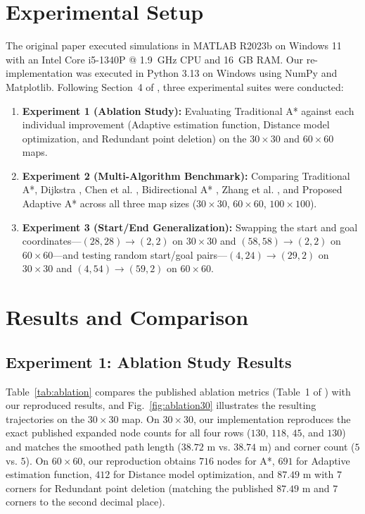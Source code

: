 \documentclass[conference]{IEEEtran}
\begin{document}
\begin{enumerate}
\section{Experimental Setup}
The original paper executed simulations in MATLAB R2023b on Windows 11 with an Intel Core i5-1340P @ 1.9~GHz CPU and 16~GB RAM. Our re-implementation was executed in Python 3.13 on Windows using NumPy and Matplotlib. Following Section~4 of \cite{cao2026adaptive}, three experimental suites were conducted:
\begin{enumerate}
    \item \textbf{Experiment 1 (Ablation Study):} Evaluating Traditional A* against each individual improvement (Adaptive estimation function, Distance model optimization, and Redundant point deletion) on the $30 \times 30$ and $60 \times 60$ maps.
    \item \textbf{Experiment 2 (Multi-Algorithm Benchmark):} Comparing Traditional A*, Dijkstra \cite{dijkstra1959note}, Chen et al. \cite{chen2023improved}, Bidirectional A* \cite{xu2024hybrid}, Zhang et al. \cite{zhang2023global}, and Proposed Adaptive A* across all three map sizes ($30 \times 30$, $60 \times 60$, $100 \times 100$).
    \item \textbf{Experiment 3 (Start/End Generalization):} Swapping the start and goal coordinates—$(28,28)\to(2,2)$ on $30 \times 30$ and $(58,58)\to(2,2)$ on $60 \times 60$—and testing random start/goal pairs—$(4,24)\to(29,2)$ on $30 \times 30$ and $(4,54)\to(59,2)$ on $60 \times 60$.
\end{enumerate}

\section{Results and Comparison}
\subsection{Experiment 1: Ablation Study Results}
Table~\ref{tab:ablation} compares the published ablation metrics (Table~1 of \cite{cao2026adaptive}) with our reproduced results, and Fig.~\ref{fig:ablation30} illustrates the resulting trajectories on the $30 \times 30$ map. On $30 \times 30$, our implementation reproduces the exact published expanded node counts for all four rows ($130$, $118$, $45$, and $130$) and matches the smoothed path length ($38.72\text{ m}$ vs. $38.74\text{ m}$) and corner count ($5$ vs. $5$). On $60 \times 60$, our reproduction obtains $716$ nodes for A*, $691$ for Adaptive estimation function, $412$ for Distance model optimization, and $87.49\text{ m}$ with $7$ corners for Redundant point deletion (matching the published $87.49\text{ m}$ and $7$ corners to the second decimal place).


\end{enumerate}
\end{document}
